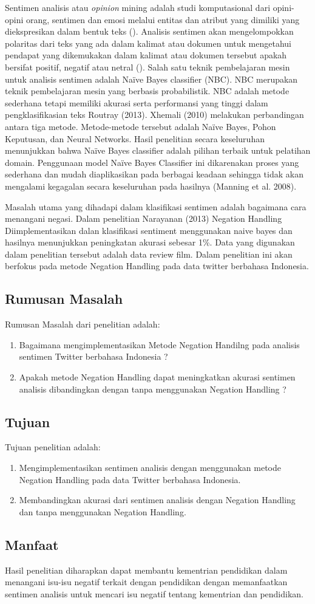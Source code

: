 Sentimen analisis atau \textit{opinion} mining adalah studi komputasional dari opini-opini orang, sentimen dan emosi melalui entitas dan atribut yang dimiliki yang diekspresikan dalam bentuk teks \citeauthor{LIU2012} (\cite*{LIU2012}). Analisis sentimen akan mengelompokkan polaritas dari teks yang ada dalam kalimat atau dokumen untuk mengetahui pendapat yang dikemukakan dalam kalimat atau dokumen tersebut apakah bersifat positif, negatif atau netral \cite{Pang+Lee+Vaithyanathan:02a} (\cite*{Pang+Lee+Vaithyanathan:02a}). Salah satu teknik pembelajaran mesin untuk analisis sentimen adalah Naïve Bayes classifier (NBC). NBC merupakan teknik pembelajaran mesin yang berbasis probabilistik. NBC adalah metode sederhana tetapi memiliki akurasi serta performansi yang tinggi dalam pengklasifikasian teks Routray (2013). Xhemali (2010) melakukan perbandingan antara tiga metode. Metode-metode tersebut adalah Naïve Bayes, Pohon Keputusan, dan Neural Networks. Hasil penelitian secara keseluruhan menunjukkan bahwa Naïve Bayes classifier adalah pilihan terbaik untuk pelatihan domain. Penggunaan model Naïve Bayes Classifier ini dikarenakan proses yang sederhana dan mudah diaplikasikan pada berbagai keadaan sehingga tidak akan mengalami kegagalan secara keseluruhan pada hasilnya (Manning et al. 2008).

Masalah utama yang dihadapi dalam klasifikasi sentimen adalah bagaimana cara menangani negasi. Dalam penelitian Narayanan (2013) Negation Handling Diimplementasikan dalan klasifikasi sentiment menggunakan naive bayes dan hasilnya menunjukkan peningkatan akurasi sebesar 1\%. Data yang digunakan dalam penelitian tersebut adalah data review film. Dalam penelitian ini akan berfokus pada metode Negation Handling pada data twitter berbahasa Indonesia.


\subsection*{Rumusan Masalah}
Rumusan Masalah dari penelitian adalah:
\begin{enumerate}[noitemsep] 
	\item Bagaimana mengimplementasikan Metode Negation Handilng pada analisis sentimen Twitter berbahasa Indonesia ?
	\item Apakah metode Negation Handling dapat meningkatkan akurasi sentimen analisis dibandingkan dengan tanpa menggunakan Negation Handling ?
\end{enumerate}

\subsection*{Tujuan}
Tujuan penelitian adalah:
\begin{enumerate}[noitemsep] 
	\item Mengimplementasikan sentimen analisis dengan menggunakan metode Negation Handling pada data Twitter berbahasa Indonesia.
	\item Membandingkan akurasi dari sentimen analisis dengan Negation Handling dan tanpa menggunakan Negation Handling.
\end{enumerate}

\subsection*{Manfaat}
Hasil penelitian diharapkan dapat membantu kementrian pendidikan dalam menangani isu-isu negatif terkait dengan pendidikan dengan memanfaatkan sentimen analisis untuk mencari isu negatif tentang kementrian dan pendidikan.
